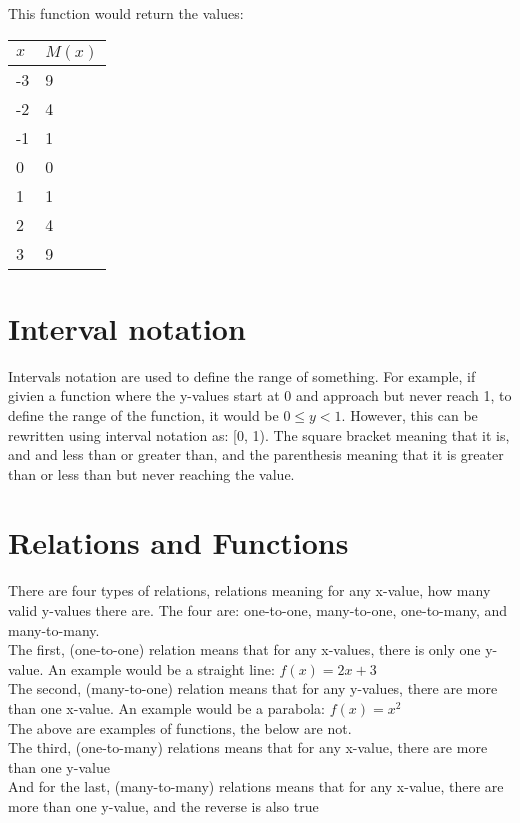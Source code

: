 \documentclass[a4paper,10pt]{report}
\begin{document}
This function would return the values:
\begin{center}
	\begin{tabular}{l|l}
		$x$  & $M(x)$ \\ \hline
		-3 & 9    \\
		-2 & 4    \\
		-1 & 1    \\
		0  & 0    \\
		1  & 1    \\
		2  & 4    \\
		3  & 9
	\end{tabular}
\end{center}

\section{Interval notation}
Intervals notation are used to define the range of something.  For example, if givien a function where the y-values start at 0 and approach but never reach 1, to define the range of the function, it would be $0 \leq y < 1$.  However, this can be rewritten using interval notation as: [0, 1).  The square bracket meaning that it is, and and less than or greater than, and the parenthesis meaning that it is greater than or less than but never reaching the value.


\section{Relations and Functions}
There are four types of relations, relations meaning for any x-value, how many valid y-values there are.  The four are: one-to-one, many-to-one, one-to-many, and many-to-many.\\

The first, (one-to-one) relation means that for any x-values, there is only one y-value.  An example would be a straight line: $f(x) = 2x + 3$\\

The second, (many-to-one) relation means that for any y-values, there are more than one x-value.  An example would be a parabola: $f(x) = x^2$\\

The above are examples of functions, the below are not.\\

The third, (one-to-many) relations means that for any x-value, there are more than one y-value\\

And for the last, (many-to-many) relations means that for any x-value, there are more than one y-value, and the reverse is also true


\end{document}

